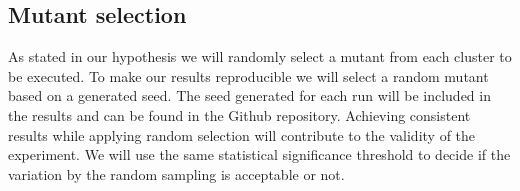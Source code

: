 \documentclass[../../main]{subfiles}
\begin{document}
\subsection{Mutant selection}
As stated in our hypothesis we will randomly select a mutant from each cluster to be executed.
To make our results reproducible we will select a random mutant based on a generated seed.
The seed generated for each run will be included in the results and can be found in the Github repository\cite{rbasarat-repo}.
Achieving consistent results while applying random selection will contribute to the validity of the experiment.
We will use the same statistical significance threshold to decide if the variation by the random sampling is acceptable or not.
\end{document}
